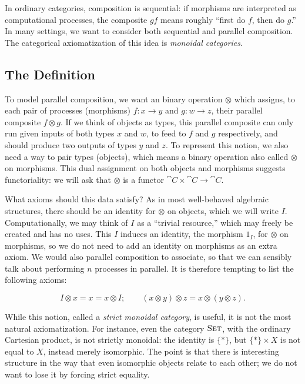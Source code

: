 In ordinary categories, composition is sequential: if morphisms are interpreted
as computational processes, the composite $gf$ means roughly ``first do $f$,
then do $g$.'' In many settings, we want to consider both sequential and
parallel composition. The categorical axiomatization of this idea is
\emph{monoidal categories}.

\subsection{The Definition}
\label{sec:monoidal definition}

To model parallel composition, we want an binary operation $\otimes$ which
assigns, to each pair of processes (morphisms) $f:x\to y$ and $g:w\to z$, their
parallel composite $f\otimes g$. If we think of objects as types, this parallel
composite can only run given inputs of both types $x$ and $w$, to feed to $f$
and $g$ respectively, and should produce two outputs of types $y$ and $z$. To
represent this notion, we also need a way to pair types (objects), which means a
binary operation also called $\otimes$ on morphisms. This dual assignment on
both objects and morphisms suggests functoriality: we will ask that $\otimes$ is
a functor $\cat{C}\times\cat{C}\to\cat{C}$.

What axioms should this data satisfy? As in most well-behaved algebraic
structures, there should be an identity for $\otimes$ on objects, which we will
write $I$. Computationally, we may think of $I$ as a ``trivial resource,'' which
may freely be created and has no uses. This $I$ induces an identity, the
morphism $1_I$, for $\otimes$ on morphisms, so we do not need to add an identity
on morphisms as an extra axiom. We would also parallel composition to associate,
so that we can sensibly talk about performing $n$ processes in parallel. It is
therefore tempting to list the following axioms:

\[
  I\otimes x = x = x\otimes I; \quad\quad (x\otimes y)\otimes z =
  x\otimes(y\otimes z).
\]

While this notion, called a \emph{strict monoidal category}, is useful, it is
not the most natural axiomatization. For instance, even the category
${\textsc{\text{Set}}}$, with the ordinary Cartesian product, is not strictly monoidal: the
identity is $\{*\}$, but $\{*\}\times X$ is not equal to $X$, instead merely
isomorphic. The point is that there is interesting structure in the way that
even isomorphic objects relate to each other; we do not want to lose it by
forcing strict equality.

